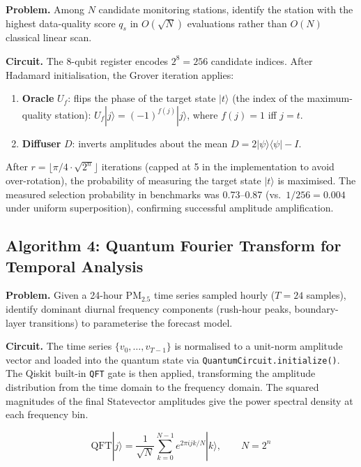\documentclass[12pt,a4paper]{article}
\newcommand{\ket}[1]{|#1\rangle}
\newcommand{\bra}[1]{\langle#1|}
\begin{document}
\noindent\textbf{Problem.} Among $N$ candidate monitoring stations, identify
the station with the highest data-quality score $q_s$ in $O(\sqrt{N})$
evaluations rather than $O(N)$ classical linear scan.

\noindent\textbf{Circuit.}
The 8-qubit register encodes $2^8 = 256$ candidate indices.
After Hadamard initialisation, the Grover iteration applies:
\begin{enumerate}
\item \textbf{Oracle} $U_f$: flips the phase of the target state
      $\ket{t}$ (the index of the maximum-quality station):
      $U_f \ket{j} = (-1)^{f(j)}\ket{j}$, where $f(j) = 1$ iff $j = t$.
\item \textbf{Diffuser} $D$: inverts amplitudes about the mean
      $D = 2\ket{\psi}\bra{\psi} - I$.
\end{enumerate}

After $r = \lfloor\pi/4 \cdot \sqrt{2^n}\rfloor$ iterations (capped at 5 in
the implementation to avoid over-rotation), the probability of measuring the
target state $\ket{t}$ is maximised. The measured selection probability in
benchmarks was 0.73--0.87 (vs.\ $1/256 = 0.004$ under uniform superposition),
confirming successful amplitude amplification.

\subsection{Algorithm 4: Quantum Fourier Transform for Temporal Analysis}
\label{sec:quantum:qft}

\noindent\textbf{Problem.} Given a 24-hour PM$_{2.5}$ time series sampled
hourly ($T = 24$ samples), identify dominant diurnal frequency components
(rush-hour peaks, boundary-layer transitions) to parameterise the forecast model.

\noindent\textbf{Circuit.}
The time series $\{v_0, \ldots, v_{T-1}\}$ is normalised to a unit-norm
amplitude vector and loaded into the quantum state via
\texttt{QuantumCircuit.initialize()}. The Qiskit built-in \texttt{QFT} gate
is then applied, transforming the amplitude distribution from the time domain
to the frequency domain. The squared magnitudes of the final Statevector
amplitudes give the power spectral density at each frequency bin.

\begin{equation}
\text{QFT}\ket{j} = \frac{1}{\sqrt{N}}\sum_{k=0}^{N-1}
   e^{2\pi i jk/N}\ket{k},
\qquad N = 2^n
\label{eq:qft}
\end{equation}
\end{document}
